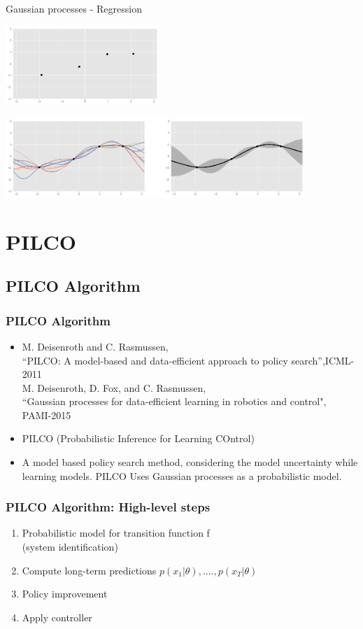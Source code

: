 \documentclass{beamer}
\begin{document}
\begin{frame}{Gaussian processes - Regression}
\begin{center}
    \includegraphics[height=3cm]{img/data.png}
    
    \includegraphics[height=3cm]{img/DPregression.png}
\end{center}
\end{frame}

\section{PILCO}

\subsection{PILCO Algorithm}

\begin{frame}
  \frametitle{PILCO Algorithm}
  \begin{itemize}
  \item 
  M. Deisenroth and C. Rasmussen, \\
  “PILCO: A model-based and data-efficient approach to policy search”,ICML-2011\\
  M. Deisenroth, D. Fox, and C. Rasmussen,\\
  “Gaussian processes for data-efficient learning in robotics and control", PAMI-2015
  \item PILCO (Probabilistic Inference for Learning COntrol)
  \item A model based policy search method, considering the model uncertainty while learning models. PILCO Uses Gaussian processes as a probabilistic model.
  \end{itemize}
\end{frame}

\begin{frame}
\frametitle{PILCO Algorithm: High-level steps}
\begin{enumerate}
    \item Probabilistic model for transition function f \\
     (system identification)
    \item Compute long-term predictions $p(x_1|\theta),....,p(x_T|\theta)$
    \item Policy improvement
    \item Apply controller
\end{enumerate}
\end{frame}
\end{document}
